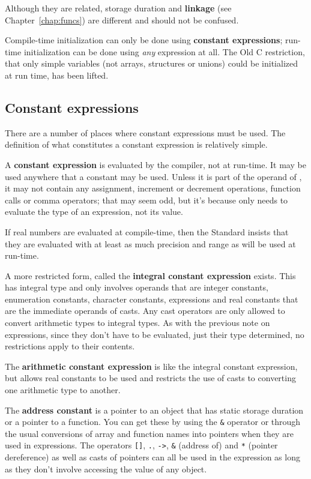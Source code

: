    Although they are related,
   storage duration and \textbf{linkage} (see Chapter~\ref{chap:funcs})
   are different and should not be confused.


  Compile-time initialization can only be done using \textbf{constant
   expressions}; run-time initialization can be done using \textit{any}
   expression at all. The Old C restriction, that only simple variables (not
   arrays, structures or unions) could be initialized at run time, has been
   lifted.


  \subsection{Constant expressions}
   

   There are a number of places where constant expressions must be used. The
    definition of what constitutes a constant expression is relatively
    simple.


   A \textbf{constant expression} is evaluated by the compiler, not at
    run-time. It may be used anywhere that a constant may be used. Unless it is
    part of the operand of \sizeof, it may not contain any
    assignment, increment or decrement operations, function calls or comma
    operators; that may seem odd, but it's because \sizeof{} only
    needs to evaluate the type of an expression, not its value.


   If real numbers are evaluated at compile-time, then the Standard insists
    that they are evaluated with at least as much precision and range as will
    be used at run-time.


   A more restricted form, called the \textbf{integral constant
    expression} exists. This has integral type and only involves operands
    that are integer constants, enumeration constants, character constants,
    \sizeof{} expressions and real constants that are the immediate
    operands of casts. Any cast operators are only allowed to convert
    arithmetic types to integral types. As with the previous note on
    \sizeof{} expressions, since they don't have to be evaluated,
    just their type determined, no restrictions apply to their contents.


   The \textbf{arithmetic constant expression} is like the integral
    constant expression, but allows real constants to be used and restricts the
    use of casts to converting one arithmetic type to another.


   The \textbf{address constant} is a pointer to an object that has static
    storage duration or a pointer to a function. You can get these by using the
    \texttt{\&} operator or through the usual conversions of array and
    function names into pointers when they are used in expressions. The
    operators \texttt{[]}, \texttt{.}, \texttt{->},
    \texttt{\&} (address of) and \texttt{*} (pointer dereference) as
    well as casts of pointers can all be used in the expression as long as they
    don't involve accessing the value of any object.


